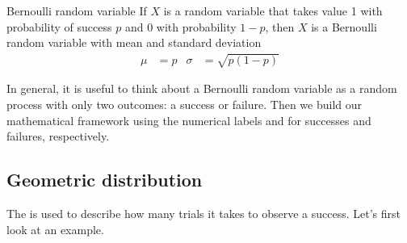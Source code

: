 \begin{onebox}{Bernoulli random variable}
  If $X$ is a random variable that takes value 1 with
  probability of success $p$ and 0 with probability $1-p$,
  then $X$ is a Bernoulli random variable with mean
  and standard deviation
  \begin{align*}
  \mu &= p
      &\sigma&= \sqrt{p(1-p)}
  \end{align*}
\end{onebox}

In general, it is useful to think about a Bernoulli random variable as a random process with only two outcomes: a success or failure. Then we build our mathematical framework using the numerical labels  and  for successes and failures, respectively.




\D{\newpage}

\subsection{Geometric distribution}


The 
is used to describe how
many trials it takes to observe a success.
Let's first look at an example.

